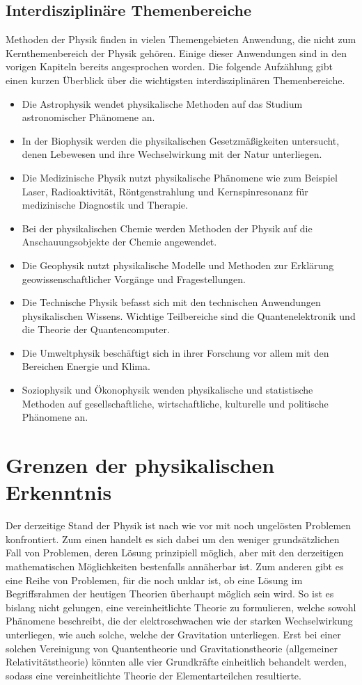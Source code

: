\documentclass[titlepage, parkskip=full, twocolumn, landscape]{scrartcl}
\begin{document}
\subsection{Interdisziplinäre Themenbereiche}

Methoden der Physik finden in vielen Themengebieten Anwendung, die nicht zum Kern\-themen\-bereich der Physik gehören. Einige dieser Anwendungen sind in den vorigen Kapiteln bereits angesprochen worden. Die folgende Aufzählung gibt einen kurzen Überblick über die wichtigsten interdisziplinären Themenbereiche.
\begin{itemize}
	\item Die Astrophysik wendet physikalische Methoden auf das Studium astronomischer Phänomene an.
	\item In der Biophysik werden die physikalischen Gesetzmäßigkeiten untersucht, denen Lebewesen und ihre Wechselwirkung mit der Natur unterliegen.
	\item Die Medizinische Physik nutzt physikalische Phänomene wie zum Beispiel Laser, Radioaktivität, Röntgenstrahlung und Kernspinresonanz für medizinische Diagnostik und Therapie.
	\item Bei der physikalischen Chemie werden Methoden der Physik auf die Anschauungsobjekte der Chemie angewendet.
	\item Die Geophysik nutzt physikalische Modelle und Methoden zur Erklärung geowissenschaftlicher Vorgänge und Fragestellungen.
	\item Die Technische Physik befasst sich mit den technischen Anwendungen physikalischen Wissens. Wichtige Teilbereiche sind die Quantenelektronik und die Theorie der Quantencomputer.
	\item Die Umweltphysik beschäftigt sich in ihrer Forschung vor allem mit den Bereichen Energie und Klima.
	\item Soziophysik und Ökonophysik wenden physikalische und statistische Methoden auf gesellschaftliche, wirtschaftliche, kulturelle und politische Phänomene an.
\end{itemize}

\section{Grenzen der physikalischen Erkenntnis}

Der derzeitige Stand der Physik ist nach wie vor mit noch ungelösten Problemen konfrontiert. Zum einen handelt es sich dabei um den weniger grundsätzlichen Fall von Problemen, deren Lösung prinzipiell möglich, aber mit den derzeitigen mathematischen Möglichkeiten bestenfalls annäherbar ist. Zum anderen gibt es eine Reihe von Problemen, für die noch unklar ist, ob eine Lösung im Begriffsrahmen der heutigen Theorien überhaupt möglich sein wird. So ist es bislang nicht gelungen, eine vereinheitlichte Theorie zu formulieren, welche sowohl Phänomene beschreibt, die der elektroschwachen wie der starken Wechselwirkung unterliegen, wie auch solche, welche der Gravitation unterliegen. Erst bei einer solchen Vereinigung von Quantentheorie und Gravitationstheorie (allgemeiner Relativitätstheorie) könnten alle vier Grundkräfte einheitlich behandelt werden, sodass eine vereinheitlichte Theorie der Elementarteilchen resultierte.
\end{document}

